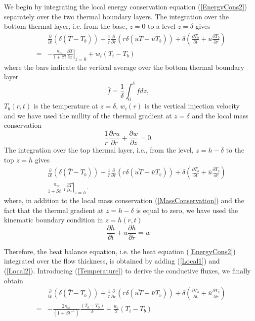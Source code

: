 We begin by integrating the local energy conservation equation
(\ref{EnergyCons2}) separately  over the two thermal  boundary layers.
The integration  over the  bottom thermal layer,  i.e. from  the base,
$z=0$ to a level $z = \delta$ gives
\begin{eqnarray}
  &&\frac{\partial}{\partial t}\left( \delta( \bar{T}-T_b)\right)+\frac{1}{r}\frac{\partial}{\partial r} \left( r\delta(\overline{uT}-\bar{u}T_b)\right) + \delta\left( \frac{\partial T_b}{\partial t}+ \overline{u}\frac{\partial T_b}{\partial r}\right)\nonumber\\
  &=&-\frac{\kappa_m}{1+St}\left. \frac{\partial T}{\partial z}\right|_{z=0}+w_{i}(T_{i}-T_b)
      \label{Local1}
\end{eqnarray}
where the  bars indicate the  vertical average over the  bottom thermal
boundary layer
\begin{equation}
  \overline{f} = \frac{1}{\delta}\int_0^{\delta}f dz\nonumber,
\end{equation}
$T_b(r,t)$  is  the temperature  at  $z=\delta$,  $w_{i}(r)$ is  the
vertical  injection velocity  and  we  have used  the  nullity of  the
thermal gradient at $z=\delta$ and the local mass conservation
\begin{equation}
  \frac{1}{r}\frac{\partial ru}{\partial r} +\frac{\partial w}{\partial z}=0.
  \label{MassConservation}
\end{equation}
The  integration over  the top  thermal layer,  i.e., from  the level,
$z=h-\delta$ to the top $z=h$ gives
\begin{eqnarray}
  &&\frac{\partial}{\partial t}\left( \delta( \bar{T}-T_b)\right)+\frac{1}{r}\frac{\partial}{\partial r} \left( r\delta(\overline{uT}-\bar{u}T_b)\right) + \delta\left(\frac{\partial T_b}{\partial t}+ \overline{u}\frac{\partial T_b}{\partial r}\right)\nonumber\\
  &=&\frac{\kappa_m}{1+St^{-1}}\left. \frac{\partial T}{\partial z}\right|_{z=h}.
      \label{Local2}
\end{eqnarray}
where,    in    addition    to    the    local    mass    conservation
(\ref{MassConservation})  and the  fact that  the thermal  gradient at
$z=h-\delta$ is  equal to  zero, we have  used the  kinematic boundary
condition in $z=h(r,t)$
\begin{equation}
  \frac{\partial h}{\partial t} +u\frac{\partial h}{\partial
    r} = w
\end{equation}

Therefore,  the  heat  balance   equation,  i.e.   the  heat  equation
(\ref{EnergyCons2})  integrated  over  the  flow  thickness,  is
obtained  by adding  (\ref{Local1})  and (\ref{Local2}).   Introducing
(\ref{Temperature}) to derive the conductive fluxes, we finally obtain
\begin{eqnarray}
  &&\frac{\partial}{\partial t}\left( \delta( \bar{T}-T_b)\right)+\frac{1}{r}\frac{\partial}{\partial r} \left( r\delta(\overline{uT}-\bar{u}T_b)\right) + \delta\left( \frac{\partial T_b}{\partial t}+ \overline{u}\frac{\partial T_b}{\partial r}\right)\nonumber\\
  &=&-\frac{2\kappa_m}{(1+St^{-1})}\frac{\left( T_b - T_0\right)}{\delta}+\frac{w_{i}}{2}(T_{i}-T_b)
      \label{LocalHeat3}
\end{eqnarray}

